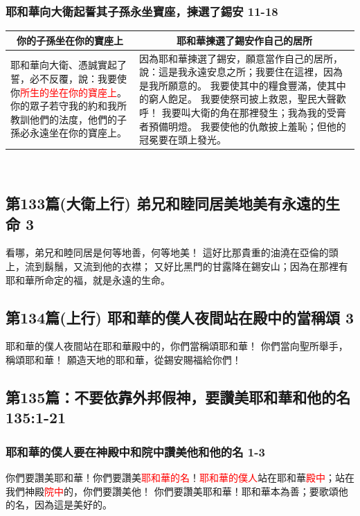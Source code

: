 \subsubsection{耶和華向大衛起誓其子孫永坐寶座，揀選了錫安 11-18}
\begin{table}[H]
\centering
\begin{tabular}{p{5.75cm}|p{11.00cm}}\hline\hline
\multicolumn{1}{c|}{你的子孫坐在你的寶座上}&\multicolumn{1}{c}{耶和華揀選了錫安作自己的居所}\\\hline
耶和華向大衛、憑誠實起了誓，必不反覆，說：我要使你\textcolor{red}{所生的坐在你的寶座上}。
你的眾子若守我的約和我所教訓他們的法度，他們的子孫必永遠坐在你的寶座上。
&因為耶和華揀選了錫安，願意當作自己的居所，
說：這是我永遠安息之所；我要住在這裡，因為是我所願意的。
我要使其中的糧食豐滿，使其中的窮人飽足。
我要使祭司披上救恩，聖民大聲歡呼！
我要叫大衛的角在那裡發生；我為我的受膏者預備明燈。
我要使他的仇敵披上羞恥；但他的冠冕要在頭上發光。\\\hline
\end{tabular}
\end{table} 




\subsection{第133篇(大衛上行) 弟兄和睦同居美地美有永遠的生命 3}
看哪，弟兄和睦同居是何等地善，何等地美！
這好比那貴重的油澆在亞倫的頭上，流到鬍鬚，又流到他的衣襟；
又好比黑門的甘露降在錫安山；因為在那裡有耶和華所命定的福，就是永遠的生命。

\subsection{第134篇(上行) 耶和華的僕人夜間站在殿中的當稱頌 3}
耶和華的僕人夜間站在耶和華殿中的，你們當稱頌耶和華！
你們當向聖所舉手，稱頌耶和華！
願造天地的耶和華，從錫安賜福給你們！


\subsection{第135篇：不要依靠外邦假神，要讚美耶和華和他的名 135:1-21}
\subsubsection{耶和華的僕人要在神殿中和院中讚美他和他的名 1-3}
你們要讚美耶和華！你們要讚美\textcolor{red}{耶和華的名}！\textcolor{red}{耶和華的僕人}站在耶和華\textcolor{red}{殿中}；站在我們神殿\textcolor{red}{院中}的，你們要讚美他！
你們要讚美耶和華！耶和華本為善；要歌頌他的名，因為這是美好的。

